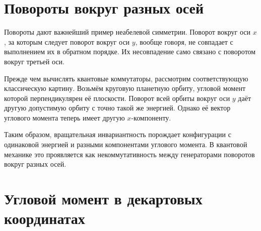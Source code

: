 \begin{classroomqa}
\end{classroomqa}

\section{Повороты вокруг разных осей}

Повороты дают важнейший пример неабелевой симметрии. Поворот вокруг оси \(x\), за которым следует поворот вокруг оси \(y\), вообще говоря, не совпадает с выполнением их в обратном порядке. Их несовпадение само связано с поворотом вокруг третьей оси.

\begin{classroomqa}
\end{classroomqa}

Прежде чем вычислять квантовые коммутаторы, рассмотрим соответствующую классическую картину. Возьмём круговую планетную орбиту, угловой момент которой перпендикулярен её плоскости. Поворот всей орбиты вокруг оси \(y\) даёт другую допустимую орбиту с точно такой же энергией. Однако её вектор углового момента теперь имеет другую \(x\)-компоненту.

Таким образом, вращательная инвариантность порождает конфигурации с одинаковой энергией и разными компонентами углового момента. В квантовой механике это проявляется как некоммутативность между генераторами поворотов вокруг разных осей.

\section{Угловой момент в декартовых координатах}

